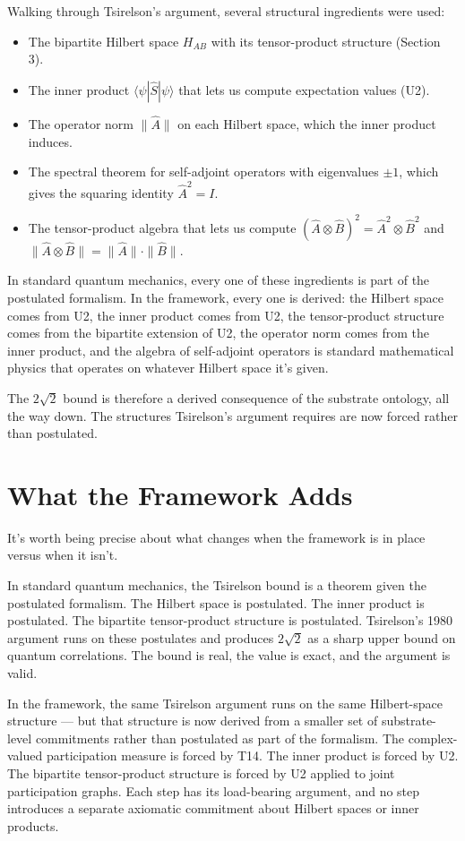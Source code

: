 \documentclass[11pt,a4paper]{article}
\begin{document}
Walking through Tsirelson's argument, several structural ingredients were used:
\begin{itemize}[noitemsep]
  \item The bipartite Hilbert space $H_{AB}$ with its tensor-product structure (Section 3).
  \item The inner product $\langle\psi|\hat{S}|\psi\rangle$ that lets us compute expectation values (U2).
  \item The operator norm $\|\hat{A}\|$ on each Hilbert space, which the inner product induces.
  \item The spectral theorem for self-adjoint operators with eigenvalues $\pm 1$, which gives the squaring identity $\hat{A}^2 = I$.
  \item The tensor-product algebra that lets us compute $(\hat{A} \otimes \hat{B})^2 = \hat{A}^2 \otimes \hat{B}^2$ and $\|\hat{A} \otimes \hat{B}\| = \|\hat{A}\| \cdot \|\hat{B}\|$.
\end{itemize}

In standard quantum mechanics, every one of these ingredients is part of the postulated formalism. In the framework, every one is derived: the Hilbert space comes from U2, the inner product comes from U2, the tensor-product structure comes from the bipartite extension of U2, the operator norm comes from the inner product, and the algebra of self-adjoint operators is standard mathematical physics that operates on whatever Hilbert space it's given.

The $2\sqrt{2}$ bound is therefore a derived consequence of the substrate ontology, all the way down. The structures Tsirelson's argument requires are now forced rather than postulated.

\section{What the Framework Adds}

It's worth being precise about what changes when the framework is in place versus when it isn't.

In standard quantum mechanics, the Tsirelson bound is a theorem given the postulated formalism. The Hilbert space is postulated. The inner product is postulated. The bipartite tensor-product structure is postulated. Tsirelson's 1980 argument runs on these postulates and produces $2\sqrt{2}$ as a sharp upper bound on quantum correlations. The bound is real, the value is exact, and the argument is valid.

In the framework, the same Tsirelson argument runs on the same Hilbert-space structure --- but that structure is now derived from a smaller set of substrate-level commitments rather than postulated as part of the formalism. The complex-valued participation measure is forced by T14. The inner product is forced by U2. The bipartite tensor-product structure is forced by U2 applied to joint participation graphs. Each step has its load-bearing argument, and no step introduces a separate axiomatic commitment about Hilbert spaces or inner products.
\end{document}

